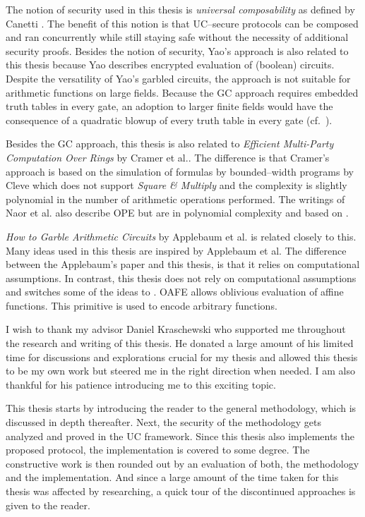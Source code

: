 The notion of security used in this thesis is \emph{universal composability} as
defined by Canetti \cite{canetti05}. The benefit of this notion is that
UC--secure protocols can be composed and ran concurrently while still staying
safe without the necessity of additional security proofs. Besides the notion of
security, Yao's  approach \cite{yao86} is also
related to this thesis because Yao describes encrypted evaluation of (boolean)
circuits.  Despite the versatility of Yao's garbled circuits, the approach is
not suitable for arithmetic functions on large fields. Because the GC approach
requires embedded truth tables in every gate, an adoption to larger finite
fields would have the consequence of a quadratic blowup of every truth table in
every gate (cf.\ \cite{naor99privacy}).

Besides the GC approach, this thesis is also related to \emph{Efficient
Multi-Party Computation Over Rings} by Cramer et al.\cite{cramer03}. The
difference is that Cramer's approach is based on the simulation of formulas by
bounded--width programs by Cleve \cite{cleve91} which does not support
\emph{Square \& Multiply} \cite{knuth81} and the complexity is slightly
polynomial in the number of arithmetic operations performed. The writings of
Naor et al.\cite{naor99,naor06} also describe OPE but are in polynomial
complexity and based on  \cite{rabin81}.

\emph{How to Garble Arithmetic Circuits} by Applebaum et al.\cite{gac2012} is
related closely to this. Many ideas used in this thesis are inspired by
Applebaum et al. The difference between the Applebaum's paper and this thesis,
is that it relies on computational assumptions. In contrast, this thesis does
not rely on computational assumptions and switches some of the ideas to
 \cite{davidgoliath}. OAFE
allows oblivious evaluation of affine functions. This primitive is used to
encode arbitrary functions.


%
%

I wish to thank my advisor Daniel Kraschewski who supported me throughout the
research and writing of this thesis. He donated a large amount of his limited
time for discussions and explorations crucial for my thesis and allowed this
thesis to be my own work but steered me in the right direction when needed.  I
am also thankful for his patience introducing me to this exciting topic.


%
%

This thesis starts by introducing the reader to the general methodology, which
is discussed in depth thereafter. Next, the security of the methodology gets
analyzed and proved in the UC framework. Since this thesis also implements the
proposed protocol, the implementation is covered to some degree. The
constructive work is then rounded out by an evaluation of both, the methodology
and the implementation. And since a large amount of the time taken for this
thesis was affected by researching, a quick tour of the discontinued approaches
is given to the reader.

